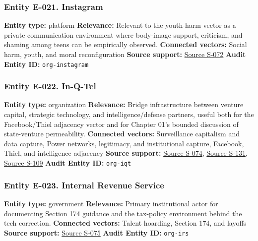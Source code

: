 \documentclass[
  american,
  11pt,
  letterpaper,
]{article}
\begin{document}
\subsubsection{Entity E-021. Instagram}\label{entity-e-021-instagram}

\textbf{Entity type:} platform \textbf{Relevance:} Relevant to the
youth-harm vector as a private communication environment where
body-image support, criticism, and shaming among teens can be
empirically observed. \textbf{Connected vectors:} Social harm, youth,
and moral reconfiguration \textbf{Source support:}
\hyperref[source-s-072-unfiltered-how-teens-engage-in-body-image-and-shaming-discussions-via-instagram-direct-messages-dms]{Source
S-072} \textbf{Audit Entity ID:} \texttt{org-instagram}

\subsubsection{Entity E-022. In-Q-Tel}\label{entity-e-022-in-q-tel}

\textbf{Entity type:} organization \textbf{Relevance:} Bridge
infrastructure between venture capital, strategic technology, and
intelligence/defense partners, useful both for the Facebook/Thiel
adjacency vector and for Chapter 01's bounded discussion of
state-venture permeability. \textbf{Connected vectors:} Surveillance
capitalism and data capture, Power networks, legitimacy, and
institutional capture, Facebook, Thiel, and intelligence adjacency
\textbf{Source support:} \hyperref[source-s-074-in-q-tel]{Source S-074},
\hyperref[source-s-131-it-pays-to-play-with-the-cia]{Source S-131},
\hyperref[source-s-109-in-q-tel-the-central-intelligence-agency-as-venture-capitalist]{Source
S-109} \textbf{Audit Entity ID:} \texttt{org-iqt}

\subsubsection{Entity E-023. Internal Revenue
Service}\label{entity-e-023-internal-revenue-service}

\textbf{Entity type:} government \textbf{Relevance:} Primary
institutional actor for documenting Section 174 guidance and the
tax-policy environment behind the tech correction. \textbf{Connected
vectors:} Talent hoarding, Section 174, and layoffs \textbf{Source
support:}
\hyperref[source-s-075-notice-2023-63-guidance-on-section-174-and-specified-research-or-experimental-expenditures]{Source
S-075} \textbf{Audit Entity ID:} \texttt{org-irs}
\end{document}
